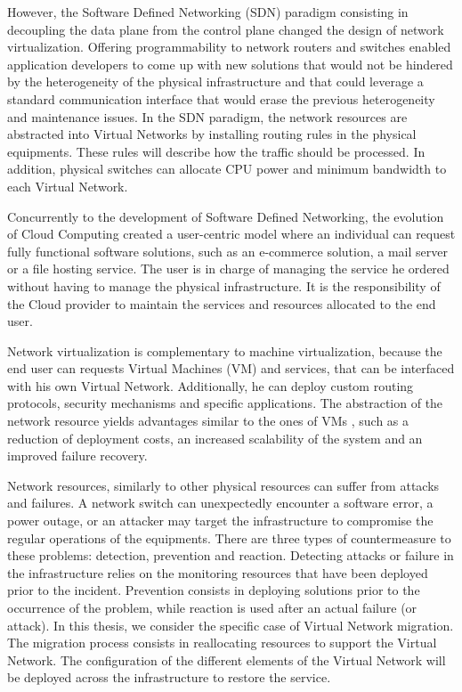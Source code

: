 However, the Software Defined Networking (SDN) paradigm consisting in decoupling the data plane from the control plane changed the design of network virtualization. Offering programmability to network routers and switches enabled application developers to come up with new solutions that would not be hindered by the heterogeneity of the physical infrastructure and that could leverage a standard communication interface that would erase the previous heterogeneity and maintenance issues.
In the SDN paradigm, the network resources are abstracted into Virtual Networks by installing routing rules in the physical equipments. These rules will describe how the traffic should be processed. In addition, physical switches can allocate CPU power and minimum bandwidth to each Virtual Network.

Concurrently to the development of Software Defined Networking, the evolution of Cloud Computing created a user-centric model where an individual can request fully functional software solutions, such as an e-commerce solution, a mail server or a file hosting service. The user is in charge of managing the service he ordered without having to manage the physical infrastructure.
It is the responsibility of the Cloud provider to maintain the services and resources allocated to the end user.

Network virtualization is complementary to machine virtualization, because the end user can requests Virtual Machines (VM) and services, that can be interfaced with his own Virtual Network. Additionally, he can deploy custom routing protocols, security mechanisms and specific applications. The abstraction of the network resource yields advantages similar to the ones of VMs , such as a reduction of deployment costs, an increased scalability of the system and an improved failure recovery.

Network resources, similarly to other physical resources can suffer from attacks and failures. A network switch can unexpectedly encounter a software error, a power outage, or an attacker may target the infrastructure to compromise the regular operations of the equipments. There are three types of countermeasure to these problems: detection, prevention and reaction. Detecting attacks or failure in the infrastructure relies on the monitoring resources that have been deployed prior to the incident. Prevention consists in deploying solutions prior to the occurrence of the problem, while reaction is used after an actual failure (or attack).
In this thesis, we consider the specific case of Virtual Network migration.
The migration process consists in reallocating resources to support the Virtual Network.
The configuration of the different elements of the Virtual Network will be deployed across the infrastructure to restore the service.

